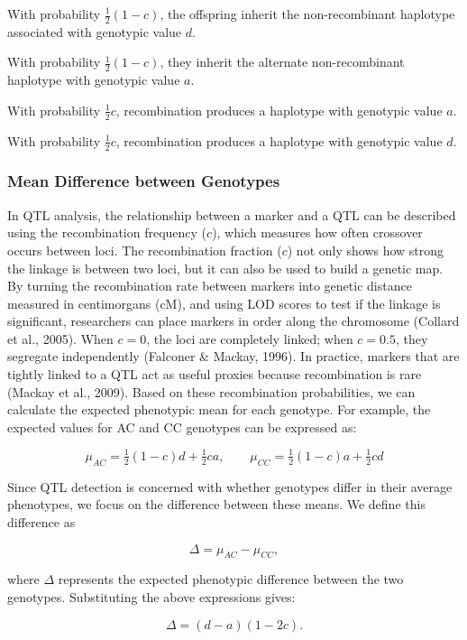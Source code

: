 \documentclass[
  letterpaper,
  DIV=11,
  numbers=noendperiod]{scrartcl}
\begin{document}
With probability \(\tfrac{1}{2}(1-c)\), the offspring inherit the
non-recombinant haplotype associated with genotypic value \(d\).

With probability \(\tfrac{1}{2}(1-c)\), they inherit the alternate
non-recombinant haplotype with genotypic value \(a\).

With probability \(\tfrac{1}{2}c\), recombination produces a haplotype
with genotypic value \(a\).

With probability \(\tfrac{1}{2}c\), recombination produces a haplotype
with genotypic value \(d\).

\subsubsection{Mean Difference between
Genotypes}\label{mean-difference-between-genotypes}

In QTL analysis, the relationship between a marker and a QTL can be
described using the recombination frequency (\(c\)), which measures how
often crossover occurs between loci. The recombination fraction (\(c\))
not only shows how strong the linkage is between two loci, but it can
also be used to build a genetic map. By turning the recombination rate
between markers into genetic distance measured in centimorgans (cM), and
using LOD scores to test if the linkage is significant, researchers can
place markers in order along the chromosome (Collard et al., 2005). When
\(c=0\), the loci are completely linked; when \(c=0.5\), they segregate
independently (Falconer \& Mackay, 1996). In practice, markers that are
tightly linked to a QTL act as useful proxies because recombination is
rare (Mackay et al., 2009). Based on these recombination probabilities,
we can calculate the expected phenotypic mean for each genotype. For
example, the expected values for AC and CC genotypes can be expressed
as:

\[
\mu_{AC} = \tfrac{1}{2}(1-c)d + \tfrac{1}{2}ca, \qquad
\mu_{CC} = \tfrac{1}{2}(1-c)a + \tfrac{1}{2}cd
\]

Since QTL detection is concerned with whether genotypes differ in their
average phenotypes, we focus on the difference between these means. We
define this difference as

\[
\Delta = \mu_{AC} - \mu_{CC},
\]

where \(\Delta\) represents the expected phenotypic difference between
the two genotypes. Substituting the above expressions gives:

\[
\Delta = (d-a)(1-2c).
\]
\end{document}
